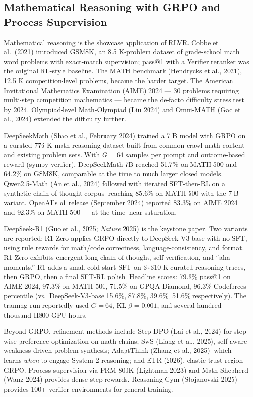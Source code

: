 \subsection{Mathematical Reasoning with GRPO and Process Supervision}\label{mathematical-reasoning-with-grpo-and-process-supervision}

Mathematical reasoning is the showcase application of RLVR. Cobbe et al.~(2021) introduced GSM8K, an 8.5 K-problem dataset of grade-school math word problems with exact-match supervision; pass@1 with a Verifier reranker was the original RL-style baseline. The MATH benchmark (Hendrycks et al., 2021), 12.5 K competition-level problems, became the harder target. The American Invitational Mathematics Examination (AIME) 2024 --- 30 problems requiring multi-step competition mathematics --- became the de-facto difficulty stress test by 2024. Olympiad-level Math-Olympiad (Liu 2024) and Omni-MATH (Gao et al., 2024) extended the difficulty further.

DeepSeekMath (Shao et al., February 2024) trained a 7 B model with GRPO on a curated 776 K math-reasoning dataset built from common-crawl math content and existing problem sets. With \(G = 64\) samples per prompt and outcome-based reward (sympy verifier), DeepSeekMath-7B reached 51.7\% on MATH-500 and 64.2\% on GSM8K, comparable at the time to much larger closed models. Qwen2.5-Math (An et al., 2024) followed with iterated SFT-then-RL on a synthetic chain-of-thought corpus, reaching 85.6\% on MATH-500 with the 7 B variant. OpenAI's o1 release (September 2024) reported 83.3\% on AIME 2024 and 92.3\% on MATH-500 --- at the time, near-saturation.

DeepSeek-R1 (Guo et al., 2025; \emph{Nature} 2025) is the keystone paper. Two variants are reported: R1-Zero applies GRPO directly to DeepSeek-V3 base with no SFT, using rule rewards for math/code correctness, language-consistency, and format. R1-Zero exhibits emergent long chain-of-thought, self-verification, and ``aha moments.'' R1 adds a small cold-start SFT on \$\sim\$10 K curated reasoning traces, then GRPO, then a final SFT-RL polish. Headline scores: 79.8\% pass@1 on AIME 2024, 97.3\% on MATH-500, 71.5\% on GPQA-Diamond, 96.3\% Codeforces percentile (vs.~DeepSeek-V3-base 15.6\%, 87.8\%, 39.6\%, 51.6\% respectively). The training run reportedly used \(G = 64\), KL \(\beta = 0.001\), and several hundred thousand H800 GPU-hours.

Beyond GRPO, refinement methods include Step-DPO (Lai et al., 2024) for step-wise preference optimization on math chains; SwS (Liang et al., 2025), self-aware weakness-driven problem synthesis; AdaptThink (Zhang et al., 2025), which learns \emph{when} to engage System-2 reasoning; and ETR (2026), elastic-trust-region GRPO. Process supervision via PRM-800K (Lightman 2023) and Math-Shepherd (Wang 2024) provides dense step rewards. Reasoning Gym (Stojanovski 2025) provides 100+ verifier environments for general training.

